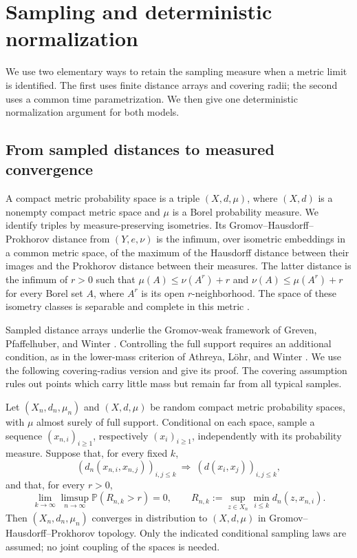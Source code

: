 \section{Sampling and deterministic normalization}
\label{sec:measured-convergence}
\label{measure:section}

We use two elementary ways to retain the sampling measure when a metric
limit is identified. The first uses finite distance arrays and covering
radii; the second uses a common time parametrization. We then give one
deterministic normalization argument for both models.

\subsection{From sampled distances to measured convergence}

A compact metric probability space is a triple $(X,d,\mu)$, where
$(X,d)$ is a nonempty compact metric space and $\mu$ is a Borel probability
measure. We identify triples by measure-preserving isometries. Its
Gromov--Hausdorff--Prokhorov distance from $(Y,e,\nu)$ is the infimum,
over isometric embeddings in a common metric space, of the maximum of
the Hausdorff distance between their images and the Prokhorov distance
between their measures. The latter distance is the infimum of $r>0$
such that $\mu(A)\leq\nu(A^r)+r$ and $\nu(A)\leq\mu(A^r)+r$
for every Borel set $A$, where $A^r$ is its open $r$-neighborhood.
The space of these isometry classes is separable and complete in this
metric \cite[Theorem~6 and Proposition~8(i)]{MiermontTessellations}.

Sampled distance arrays underlie the Gromov-weak framework of
Greven, Pfaffelhuber, and Winter \cite{GrevenPfaffelhuberWinter}.
Controlling the full support requires an additional condition, as in
the lower-mass criterion of Athreya, L\"ohr, and Winter
\cite{AthreyaLohrWinter}. We use the following covering-radius version
and give its proof. The covering assumption rules out points which carry
little mass but remain far from all typical samples.

\begin{lemma}\label{measure:criterion}
Let $(X_n,d_n,\mu_n)$ and $(X,d,\mu)$ be random compact metric
probability spaces, with $\mu$ almost surely of full support.
Conditional on each space, sample a sequence $(x_{n,i})_{i\geq1}$,
respectively $(x_i)_{i\geq1}$, independently with its probability measure.
Suppose that, for every fixed $k$,
\[
 (d_n(x_{n,i},x_{n,j}))_{i,j\leq k}
 \ \Longrightarrow\ (d(x_i,x_j))_{i,j\leq k},
\]
and that, for every $r>0$,
\begin{equation}\label{measure:covering}
 \lim_{k\to\infty}\limsup_{n\to\infty}
 \mathbb P(R_{n,k}>r)=0,
 \qquad
 R_{n,k}:=\sup_{z\in X_n}\min_{i\leq k}d_n(z,x_{n,i}).
\end{equation}
Then $(X_n,d_n,\mu_n)$ converges in distribution to $(X,d,\mu)$
in Gromov--Hausdorff--Prokhorov topology.
Only the indicated conditional sampling laws are assumed; no joint
coupling of the spaces is needed.
\end{lemma}

